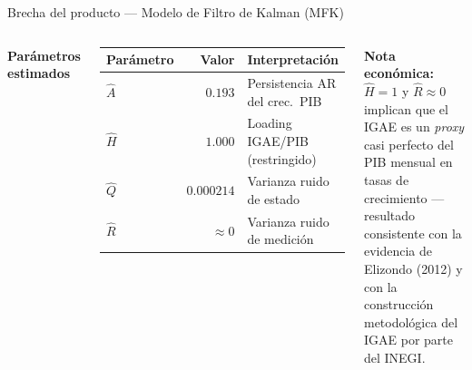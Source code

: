 \documentclass[aspectratio=169, 10pt]{beamer}
\begin{document}
\begin{frame}{Brecha del producto — Modelo de Filtro de Kalman (MFK)}
\begin{columns}[T]
    \textbf{\small Parámetros estimados}
    \vspace{3pt}
    \begin{block}{}
      \centering\small
      \begin{tabular}{lrl}
        \toprule
        Parámetro & Valor & Interpretación \\
        \midrule
        $\hat{A}$ & $0.193$ & Persistencia AR del crec.\ PIB \\
        $\hat{H}$ & $1.000$ & Loading IGAE/PIB (restringido) \\
        $\hat{Q}$ & $0.000214$ & Varianza ruido de estado \\
        $\hat{R}$ & $\approx 0$ & Varianza ruido de medición \\
        \bottomrule
      \end{tabular}
    \end{block}
    \vspace{6pt}
    \textbf{\small Nota económica:} $\hat{H}=1$ y $\hat{R}\approx 0$ implican que el
    IGAE es un \textit{proxy} casi perfecto del PIB mensual en tasas de crecimiento
    — resultado consistente con la evidencia de Elizondo (2012) y con la
    construcción metodológica del IGAE por parte del INEGI.

  \end{columns}

\end{frame}
\end{document}
